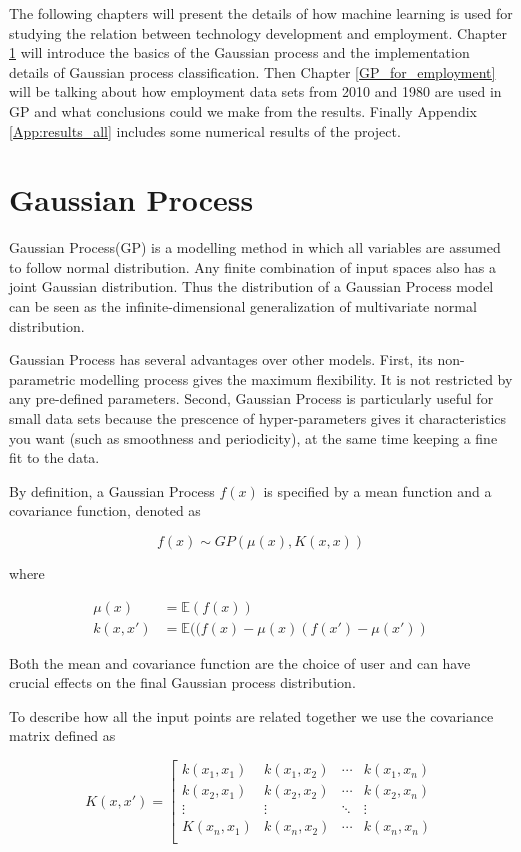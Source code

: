 \documentclass[11pt]{report}
\numberwithin{equation}{chapter}
\begin{document}
\begin{spacing}{2}
The following chapters will present the details of how machine learning is used for studying the relation between technology development and employment. Chapter  \ref{GP} will introduce the basics of the Gaussian process and the implementation details of Gaussian process classification. Then Chapter \ref{GP_for_employment} will be talking about how employment data sets from 2010 and 1980  are used in GP and what conclusions could we make from the results. Finally Appendix \ref{App:results_all} includes some numerical results of the project.




\newpage
\chapter{Gaussian Process}
\label{GP}
Gaussian Process(GP) is a modelling method in which all variables are assumed to follow normal distribution. Any finite combination of input spaces also has a joint Gaussian distribution. Thus the distribution of a Gaussian Process model can be seen as the infinite-dimensional generalization of multivariate normal distribution. 

Gaussian Process has several advantages over other models. First, its non-parametric modelling process gives the maximum flexibility. It is not restricted by any pre-defined parameters. Second, Gaussian Process is particularly useful for small data sets because the prescence of hyper-parameters gives it characteristics you want (such as smoothness and periodicity), at the same time keeping a fine fit to the data.  

By definition, a Gaussian Process $f(x)$ is specified by a mean function and a covariance function, denoted as  

\[f(x) \sim GP(\mu(x),K(x,x))\]

where

\begin{align}
\mu(x) &= \mathbb{E}(f(x))\\
k(x,x\prime) &= \mathbb{E}((f(x) - \mu(x)(f(x\prime) - \mu(x\prime)) 
\end{align}

Both the mean and covariance function are the choice of user and can have crucial effects on the final Gaussian process distribution.

To describe how all the input points are related together we use the covariance matrix defined as 

\begin{equation}
K(x,x\prime) = \left[\begin{array}{cccc}
k(x_1,x_1) & k(x_1,x_2) & \cdots & k(x_1,x_n)\\
k(x_2,x_1) & k(x_2,x_2) & \cdots & k(x_2,x_n)\\
\vdots & \vdots & \ddots & \vdots\\
K(x_n,x_1) & k(x_n,x_2) & \cdots & k(x_n,x_n)\\


\end{array}
\end{equation}
\end{spacing}
\end{document}
